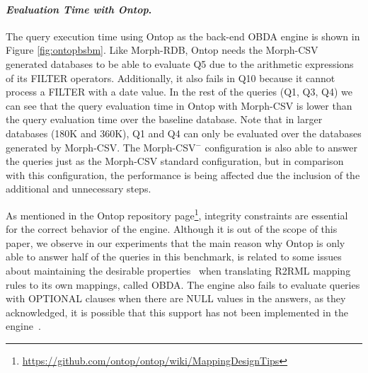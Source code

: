 \noindent\paragraph*{\textit{Evaluation Time with Ontop}.}
The query execution time using Ontop as the back-end OBDA engine is shown in Figure \ref{fig:ontopbsbm}. Like Morph-RDB, Ontop needs the Morph-CSV generated databases to be able to evaluate Q5 due to the arithmetic expressions of its FILTER operators. Additionally, it also fails in Q10 because it cannot process a FILTER with a date value. In the rest of the queries (Q1, Q3, Q4) we can see that the query evaluation time in Ontop with Morph-CSV is lower than the query evaluation time over the baseline database. Note that in larger databases (180K and 360K), Q1 and Q4 can only be evaluated over the databases generated by Morph-CSV. The Morph-CSV$^-$ configuration is also able to answer the queries just as the Morph-CSV standard configuration, but in comparison with this configuration, the performance is being affected due the inclusion of the additional and unnecessary steps.

As mentioned in the Ontop repository page\footnote{\url{https://github.com/ontop/ontop/wiki/MappingDesignTips}}, integrity constraints are essential for the correct behavior of the engine. Although it is out of the scope of this paper, we observe in our experiments that the main reason why Ontop is only able to answer half of the queries in this benchmark, is related to some issues about maintaining the desirable properties~\citep{corcho2019towards} when translating R2RML mapping rules to its own mappings, called OBDA. The engine also fails to evaluate queries with OPTIONAL clauses when there are NULL values in the answers, as they acknowledged, it is possible that this support has not been implemented in the engine~\citep{xiao2018efficient}.

